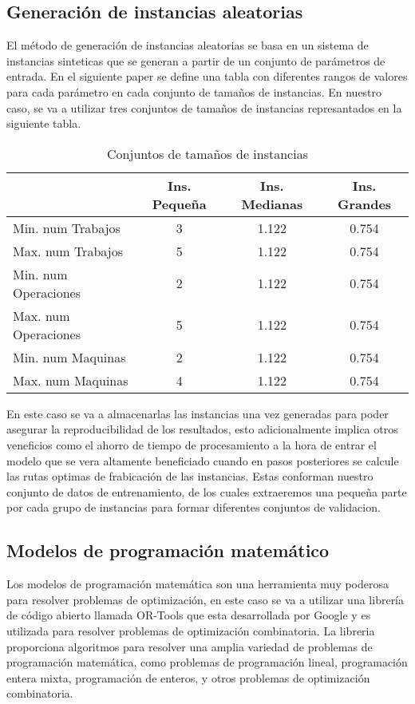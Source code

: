\subsection{Generación de instancias aleatorias}
El método de generación de instancias aleatorias se basa en un sistema de instancias sinteticas
que se generan a partir de un conjunto de parámetros de entrada. En el siguiente paper \cite{pbrandimarte}
se define una tabla con diferentes rangos de valores para cada parámetro en cada conjunto de
tamaños de instancias. En nuestro caso, se va a utilizar tres conjuntos de tamaños de instancias
represantados en la siguiente tabla.

\begin{table}[ht]
    \centering
    \begin{tabular}[t]{|l|ccc|}
        \hline
                  & Ins. Pequeña & Ins. Medianas & Ins. Grandes \\
        \hline
        Min. num Trabajos    & 3    & 1.122    & 0.754 \\
        Max. num Trabajos    & 5    & 1.122    & 0.754 \\
        Min. num Operaciones & 2    & 1.122    & 0.754 \\
        Max. num Operaciones & 5    & 1.122    & 0.754 \\
        Min. num Maquinas    & 2    & 1.122    & 0.754 \\
        Max. num Maquinas    & 4    & 1.122    & 0.754 \\
        \hline
    \end{tabular}
    \caption{Conjuntos de tamaños de instancias}
\end{table}

En este caso se va a almacenarlas las instancias una vez generadas para poder asegurar la reproducibilidad 
de los resultados, esto adicionalmente implica otros veneficios como el ahorro de tiempo de procesamiento
a la hora de entrar el modelo que se vera altamente beneficiado cuando en pasos posteriores se calcule
las rutas optimas de frabicación de las instancias. Estas conforman nuestro conjunto de datos de 
entrenamiento, de los cuales extraeremos una pequeña parte por cada grupo de instancias para formar
diferentes conjuntos de validacion. 

\subsection{Modelos de programación matemático}
Los modelos de programación matemática son una herramienta muy poderosa para resolver problemas
de optimización, en este caso se va a utilizar una librería de código abierto llamada OR-Tools 
\cite{ortools} que esta desarrollada por Google y es utilizada para resolver problemas de optimización 
combinatoria. La libreria proporciona algoritmos para resolver una amplia variedad de problemas 
de programación matemática, como problemas de programación lineal, programación entera mixta, 
programación de enteros, y otros problemas de optimización combinatoria.\medskip 

